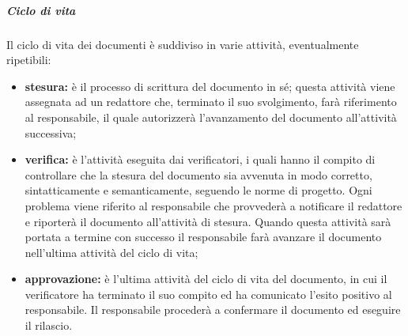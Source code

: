 				\subparagraph{Ciclo di vita}
					Il ciclo di vita dei documenti è suddiviso in varie attività, eventualmente ripetibili:
					\begin{itemize}
					\item \textbf{stesura:} è il processo di scrittura del documento in sé; questa attività viene assegnata ad un redattore che, terminato il suo svolgimento, farà riferimento al responsabile, il quale autorizzerà l'avanzamento del documento all'attività successiva;
					\item \textbf{verifica:} è l'attività eseguita dai verificatori, i quali hanno il compito di controllare che la stesura del documento sia avvenuta in modo corretto, sintatticamente e semanticamente, seguendo le norme di progetto. Ogni problema viene riferito al responsabile che provvederà a notificare il redattore e riporterà il documento all'attività di stesura. Quando questa attività sarà portata a termine con successo il responsabile farà avanzare il documento nell'ultima attività del ciclo di vita;
					\item \textbf{approvazione:} è l'ultima attività del ciclo di vita del documento, in cui il verificatore ha terminato il suo compito ed ha comunicato l'esito positivo al responsabile. Il responsabile procederà a confermare il documento ed eseguire il rilascio.
				\end{itemize}

